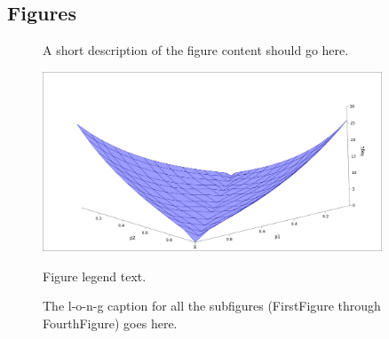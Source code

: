 \documentclass{bmcart}
\begin{document}
\begin{backmatter}

\section*{Figures}
  \begin{figure}[h!]
  \caption{
      A short description of the figure content
      should go here.}
      \end{figure}

\begin{figure}[h!]
  \caption{
      Figure legend text.}
    \includegraphics[width=0.9\textwidth]{DiffTest.png}
    \label{fig:difftest}
      \end{figure}

\begin{figure}[ht!]
\begin{center}



\end{center}
\caption{ 
The l-o-n-g caption for all the subfigures
(FirstFigure through FourthFigure) goes here.
}
\label{fig:subfigures}
\end{figure}



\end{backmatter}
\end{document}
